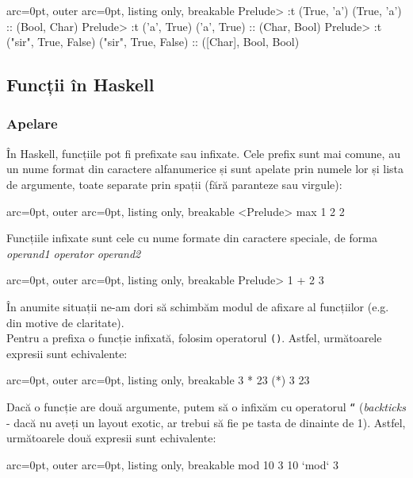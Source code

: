 \begin{tcblisting}{ arc=0pt, outer arc=0pt, listing only, breakable}
Prelude> :t (True, 'a')
(True, 'a') :: (Bool, Char)
Prelude> :t ('a', True)
('a', True) :: (Char, Bool)
Prelude> :t ("sir", True, False)
("sir", True, False) :: ([Char], Bool, Bool)

\end{tcblisting}


\subsection*{ Funcții în Haskell }

\subsubsection*{ Apelare }

În Haskell, funcțiile pot fi prefixate sau infixate. Cele prefix sunt mai comune, au un nume format din caractere alfanumerice și sunt apelate prin numele lor și lista de argumente, toate separate prin spații (fără paranteze sau virgule):


\begin{tcblisting}{ arc=0pt, outer arc=0pt, listing only, breakable}
<Prelude> max 1 2
2

\end{tcblisting}


Funcțiile infixate sunt cele cu nume formate din caractere speciale, de forma \textit{operand1 operator operand2}


\begin{tcblisting}{ arc=0pt, outer arc=0pt, listing only, breakable}
Prelude> 1 + 2
3

\end{tcblisting}


\begin{tcolorbox}[colback=blue!10, colframe=blue!20]
În anumite situații ne-am dori să schimbăm modul de afixare al funcțiilor (e.g. din motive de claritate).\\Pentru a prefixa o funcție infixată, folosim operatorul \texttt{()}. Astfel, următoarele expresii sunt echivalente:

\begin{tcblisting}{ arc=0pt, outer arc=0pt, listing only, breakable}
3 * 23
(*) 3 23

\end{tcblisting}


Dacă o funcție are două argumente, putem să o infixăm cu operatorul \texttt{``} (\textit{backticks} - dacă nu aveți un layout exotic, ar trebui să fie pe tasta de dinainte de 1). Astfel, următoarele două expresii sunt echivalente:

\begin{tcblisting}{ arc=0pt, outer arc=0pt, listing only, breakable}
mod 10 3
10 `mod` 3

\end{tcblisting}

\end{tcolorbox}

